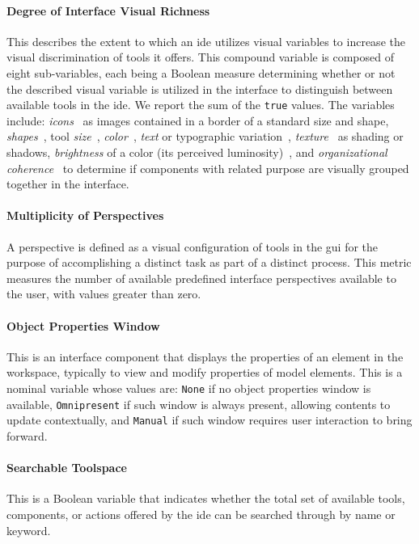 \paragraph{Degree of Interface Visual Richness}
This describes the extent to which an \ac{ide} utilizes visual variables to increase the visual discrimination of tools it offers.
This compound variable is composed of eight sub-variables, each being a Boolean measure determining whether or not the described visual variable is utilized in the interface to distinguish between available tools in the \ac{ide}.
We report the sum of the \texttt{true} values.
The variables include:
\emph{icons}~\cite{costagliola2002,moody2009} as images contained in a border of a standard size and shape,
\emph{shapes}~\cite{moody2009},
tool \emph{size}~\cite{moody2009},
\emph{color}~\cite{moody2009},
\emph{text} or typographic variation~\cite{moody2009},
\emph{texture}~\cite{moody2009} as shading or shadows,
\emph{brightness} of a color (\ie its perceived luminosity)~\cite{moody2009},
and
\emph{organizational coherence}~\cite{constantine1996} to determine if components with related purpose are visually grouped together in the interface.


\paragraph{Multiplicity of Perspectives}
A perspective is defined as a visual configuration of tools in the \ac{gui} for the purpose of accomplishing a distinct task as part of a distinct process.
This metric measures the number of available predefined interface perspectives available to the user, with values greater than zero.


\paragraph{Object Properties Window}
This is an interface component that displays the properties of an element in the workspace, typically to view and modify properties of model elements.
This is a nominal variable whose values are:
\texttt{None} if no object properties window is available,
\texttt{Omnipresent} if such window is always present, allowing contents to update contextually,
and \texttt{Manual} if such window requires user interaction to bring forward.


\paragraph{Searchable Toolspace}
This is a Boolean variable that indicates whether the total set of available tools, components, or actions offered by the \ac{ide} can be searched through by name or keyword.


